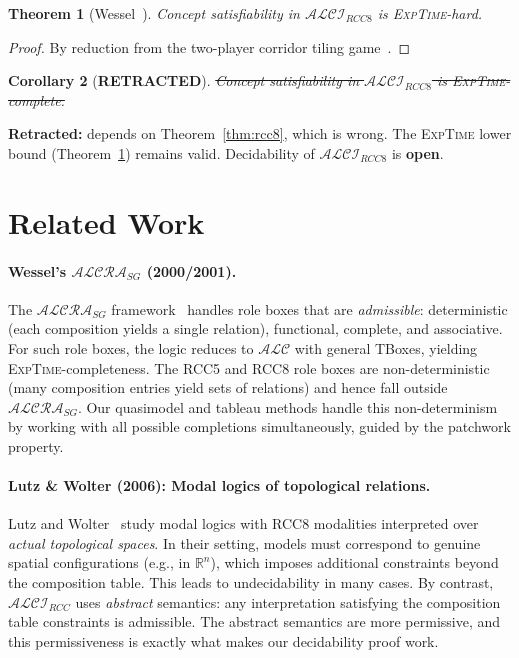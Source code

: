 \documentclass[a4paper,11pt]{article}
\newtheorem{theorem}{Theorem}[section]
\newtheorem{corollary}[theorem]{Corollary}
\theoremstyle{definition}
\newcommand{\ALC}{\ensuremath{\mathcal{ALC}}}
\newcommand{\ALCIRCC}[1]{\ensuremath{\mathcal{ALCI}_{\mathit{RCC#1}}}}
\newcommand{\ALCRASG}{\ensuremath{\mathcal{ALCRA}_{\mathit{SG}}}}
\newcommand{\EXPTIME}{\textsc{ExpTime}}
\begin{document}
\begin{theorem}[Wessel~\cite{Wessel2003}]
\label{thm:rcc8lower}
Concept satisfiability in $\ALCIRCC{8}$ is \EXPTIME-hard.
\end{theorem}

\begin{proof}
By reduction from the two-player corridor tiling game~\cite[Section
6.4]{Wessel2003}.
\end{proof}

\begin{corollary}[\textbf{RETRACTED}]
\label{cor:rcc8complete}
\sout{Concept satisfiability in $\ALCIRCC{8}$ is \EXPTIME-complete.}
\end{corollary}

\noindent
\textbf{Retracted:} depends on Theorem~\ref{thm:rcc8}, which is wrong.
The \EXPTIME{} lower bound (Theorem~\ref{thm:rcc8lower}) remains valid.
Decidability of $\ALCIRCC{8}$ is \textbf{open}.

\section{Related Work}
\label{sec:related}

\paragraph{Wessel's $\ALCRASG$ (2000/2001).}
The $\ALCRASG$ framework~\cite{Wessel2000} handles role boxes that
are \emph{admissible}: deterministic (each composition yields a single
relation), functional, complete, and associative.  For such role
boxes, the logic reduces to $\ALC$ with general TBoxes, yielding
\EXPTIME-completeness.  The RCC5 and RCC8 role boxes are
non-deterministic (many composition entries yield sets of relations)
and hence fall outside $\ALCRASG$.  Our quasimodel and tableau methods
handle this non-determinism by working with all possible completions
simultaneously, guided by the patchwork property.

\paragraph{Lutz \& Wolter (2006): Modal logics of topological relations.}
Lutz and Wolter~\cite{LutzWolter2006} study modal logics with RCC8
modalities interpreted over \emph{actual topological spaces}.  In
their setting, models must correspond to genuine spatial configurations
(e.g., in $\mathbb{R}^n$), which imposes additional constraints beyond
the composition table.  This leads to undecidability in many cases.
By contrast, $\ALCIRCC{}$ uses \emph{abstract} semantics: any
interpretation satisfying the composition table constraints is
admissible.  The abstract semantics are more permissive, and this
permissiveness is exactly what makes our decidability proof work.
\end{document}
